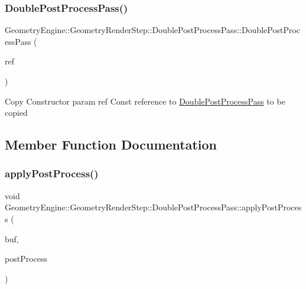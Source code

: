 \subsubsection{\texorpdfstring{DoublePostProcessPass()}{DoublePostProcessPass()}}
{\footnotesize\ttfamily Geometry\+Engine\+::\+Geometry\+Render\+Step\+::\+Double\+Post\+Process\+Pass\+::\+Double\+Post\+Process\+Pass (\begin{DoxyParamCaption}\item[{const \mbox{\hyperlink{class_geometry_engine_1_1_geometry_render_step_1_1_double_post_process_pass}{Double\+Post\+Process\+Pass}} \&}]{ref }\end{DoxyParamCaption})\hspace{0.3cm}{\ttfamily [inline]}}

Copy Constructor param ref Const reference to \mbox{\hyperlink{class_geometry_engine_1_1_geometry_render_step_1_1_double_post_process_pass}{Double\+Post\+Process\+Pass}} to be copied 

\subsection{Member Function Documentation}
\mbox{\label{class_geometry_engine_1_1_geometry_render_step_1_1_double_post_process_pass_a00a5226374ef0b93b1022444636dc84f}} 
\subsubsection{\texorpdfstring{applyPostProcess()}{applyPostProcess()}}
{\footnotesize\ttfamily void Geometry\+Engine\+::\+Geometry\+Render\+Step\+::\+Double\+Post\+Process\+Pass\+::apply\+Post\+Process (\begin{DoxyParamCaption}\item[{\mbox{\hyperlink{class_geometry_engine_1_1_geometry_buffer_1_1_g_buffer}{Geometry\+Buffer\+::\+G\+Buffer}} $\ast$}]{buf,  }\item[{const std\+::list$<$ \mbox{\hyperlink{class_geometry_engine_1_1_geometry_post_process_1_1_post_process}{Geometry\+Post\+Process\+::\+Post\+Process}} $\ast$ $>$ \&}]{post\+Process }\end{DoxyParamCaption})\hspace{0.3cm}{\ttfamily [protected]}}


